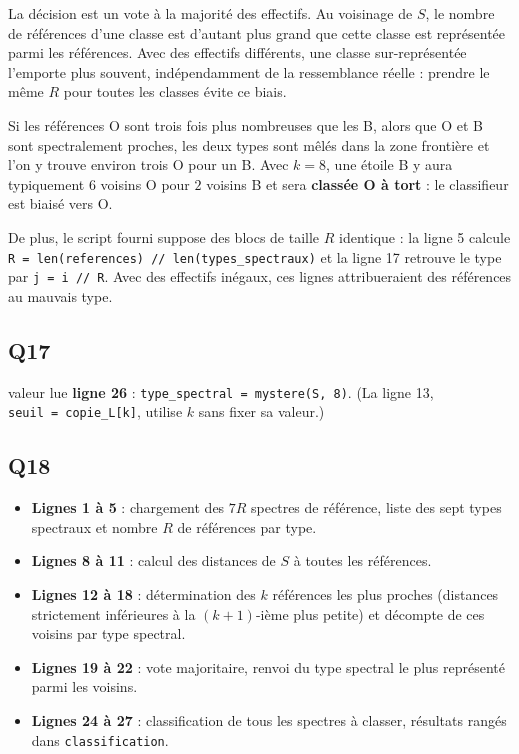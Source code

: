 \documentclass[11pt,a4paper]{article}
\providecommand{\tightlist}{\setlength{\itemsep}{0pt}\setlength{\parskip}{0pt}}
\newcommand{\equationajustee}[1]{%
  \sbox{\boiteequation}{$\displaystyle #1$}%
  \ifdim\wd\boiteequation>\linewidth
    \[\resizebox{\linewidth}{!}{\usebox{\boiteequation}}\]%
  \else
    \[#1\]%
  \fi}
\begin{document}
La décision est un vote à la majorité des effectifs. Au voisinage de \(S\), le nombre de références d'une classe est d'autant plus grand que cette classe est représentée parmi les références. Avec des effectifs différents, une classe sur-représentée l'emporte plus souvent, indépendamment de la ressemblance réelle : prendre le même \(R\) pour toutes les classes évite ce biais.

Si les références O sont trois fois plus nombreuses que les B, alors que O et B sont spectralement proches, les deux types sont mêlés dans la zone frontière et l'on y trouve environ trois O pour un B. Avec \(k = 8\), une étoile B y aura typiquement \(6\) voisins O pour \(2\) voisins B et sera \textbf{classée O à tort} : le classifieur est biaisé vers O.

De plus, le script fourni suppose des blocs de taille \(R\) identique : la ligne 5 calcule \texttt{R\ =\allowbreak{}\ len(\allowbreak{}references)\allowbreak{}\ /\allowbreak{}/\allowbreak{}\ len(\allowbreak{}types\_spectraux)\allowbreak{}} et la ligne 17 retrouve le type par \texttt{j\ =\ i\ //\ R}. Avec des effectifs inégaux, ces lignes attribueraient des références au mauvais type.

\hypertarget{q17}{%
\subsection{Q17}\label{q17}}

\equationajustee{\boxed{k = 8}}

valeur lue \textbf{ligne 26} : \texttt{type\_spectral\ =\allowbreak{}\ mystere(\allowbreak{}S,\allowbreak{}\ 8)\allowbreak{}}. (La ligne 13, \texttt{seuil\ =\allowbreak{}\ copie\_L{[}k{]}\allowbreak{}}, utilise \(k\) sans fixer sa valeur.)

\hypertarget{q18}{%
\subsection{Q18}\label{q18}}

\begin{itemize}
\tightlist
\item
  \textbf{Lignes 1 à 5} : chargement des \(7R\) spectres de référence, liste des sept types spectraux et nombre \(R\) de références par type.
\item
  \textbf{Lignes 8 à 11} : calcul des distances de \(S\) à toutes les références.
\item
  \textbf{Lignes 12 à 18} : détermination des \(k\) références les plus proches (distances strictement inférieures à la \((k+1)\)-ième plus petite) et décompte de ces voisins par type spectral.
\item
  \textbf{Lignes 19 à 22} : vote majoritaire, renvoi du type spectral le plus représenté parmi les voisins.
\item
  \textbf{Lignes 24 à 27} : classification de tous les spectres à classer, résultats rangés dans \texttt{classification}.
\end{itemize}
\end{document}
